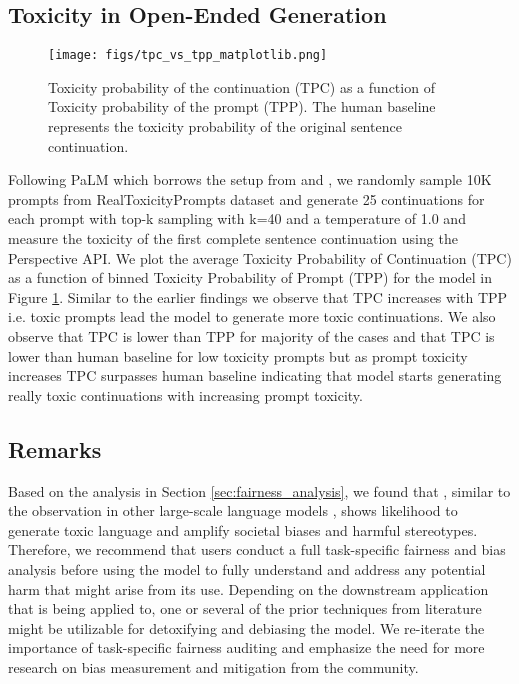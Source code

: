 \subsection{Toxicity in Open-Ended Generation}


\begin{figure}
    \centering
    \texttt{[image: figs/tpc\_vs\_tpp\_matplotlib.png]}
    \caption{Toxicity probability of the continuation (TPC) as a function of Toxicity probability of the prompt (TPP). The human baseline represents the toxicity probability of the original sentence continuation.}
    \label{fig:tpc_vs_tpp}
\end{figure}

Following PaLM \citep{Chowdhery2022PaLMSL} which borrows the setup from \citep{welbl-etal-2021-challenges-detoxifying} and \citep{rae2021scaling}, we randomly sample 10K prompts from RealToxicityPrompts dataset \citep{RealToxicityPrompts2020} and generate 25 continuations for each prompt with top-k sampling with k=40 and a temperature of 1.0 and measure the toxicity of the first complete sentence continuation using the Perspective API. We plot the average Toxicity Probability of Continuation (TPC) as a function of binned Toxicity Probability of Prompt (TPP) for the \modelname model in Figure \ref{fig:tpc_vs_tpp}. Similar to the earlier findings we observe that TPC increases with TPP i.e. toxic prompts lead the model to generate more toxic continuations. We also observe that TPC is lower than TPP for majority of the cases and that TPC is lower than human baseline for low toxicity prompts but as prompt toxicity increases TPC surpasses human baseline indicating that model starts generating really toxic continuations with increasing prompt toxicity.


\subsection{Remarks}

Based on the analysis in Section \ref{sec:fairness_analysis}, we found that \modelname, similar to the observation in other large-scale language models \citep{Du2022GLaMES, Chowdhery2022PaLMSL,Zhang2022OPTOP}, shows likelihood to generate toxic language and amplify societal biases and harmful stereotypes. Therefore, we recommend that users conduct a full task-specific fairness and bias analysis before using the model to fully understand and address any potential harm that might arise from its use. Depending on the downstream application that \modelname is being applied to, one or several of the prior techniques from literature \citep{gupta-etal-2022-mitigating, dathathri2019plug, dinan-etal-2019-build, sheng-etal-2021-societal, dinan-etal-2020-queens, liu-etal-2020-gender, sheng-etal-2019-woman, roller-etal-2021-recipes, Liang2021TowardsUA, Dinan2021AnticipatingSI, Dhamala2021BOLDDA, schick-etal-2021-self, Ouyang2022TrainingLM} might be utilizable for detoxifying and debiasing the model. We re-iterate the importance of task-specific fairness auditing and emphasize the need for more research on bias measurement and mitigation from the community.

